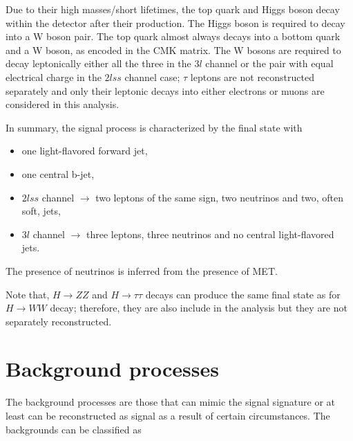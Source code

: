 Due to their high masses/short lifetimes, the top quark and Higgs boson decay within the detector after their production. The Higgs boson is required to decay into a W boson pair. The top quark almost always decays into a bottom quark and a W boson, as encoded in the CMK matrix. The W bosons are required to decay leptonically either all the three in the $3l$ channel or the pair with equal electrical charge in the $2lss$ channel case; $\tau$ leptons are not reconstructed separately and only their leptonic decays into either electrons or muons are considered in this analysis.

In summary, the signal process is characterized by the final state with

\begin{itemize}
\item one light-flavored forward jet,
\item one central b-jet,
\item $2lss$ channel $\to$ two leptons of the same sign, two neutrinos and two, often soft, jets,
\item $3l$ channel $\to$ three leptons, three neutrinos and no central light-flavored jets.
\end{itemize}

The presence of neutrinos is inferred from the presence of MET.

Note that, $H \to ZZ$ and $H\to \tau\tau$ decays can produce the same final state as for $H\to WW$ decay; therefore, they are also include in the analysis but they are not separately reconstructed.


\section{Background processes}\label{sec:bg}

The background processes are those that can mimic the signal signature or at least can be reconstructed as signal as a result of certain circumstances. The backgrounds can be classified as

